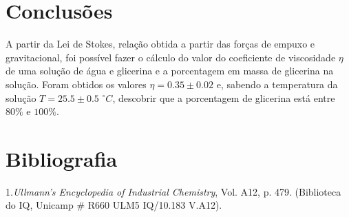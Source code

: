 \documentclass[12pt,a4paper]{article}
\begin{document}
\section{Conclusões}
A partir da Lei de Stokes, relação obtida a partir das forças de empuxo e gravitacional, foi possível fazer o cálculo do valor do coeficiente de viscosidade $\eta$ de uma solução de água e glicerina e a porcentagem em massa de glicerina na solução. Foram obtidos os valores $\eta = 0.35 \pm 0.02$ e, sabendo a temperatura da solução $T = 25.5 \pm 0.5$ $^{\circ}C$, descobrir que a porcentagem de glicerina está entre $80 \%$ e $100 \%$.


\section{Bibliografia}
1.\textit{Ullmann's Encyclopedia of Industrial Chemistry}, Vol. A12, p. 479. (Biblioteca do
IQ, Unicamp $\#$ R660 ULM5 IQ/10.183 V.A12).
\end{document}
